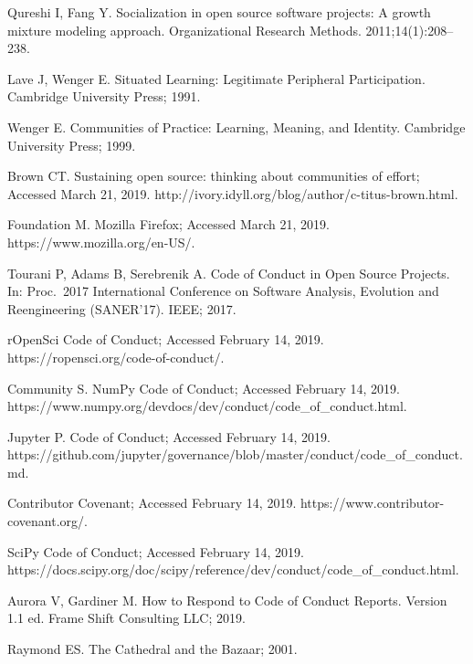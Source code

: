 \documentclass[10pt,letterpaper]{article}
\begin{document}
\begin{thebibliography}{10}

Qureshi I, Fang Y.
\newblock Socialization in open source software projects: A growth mixture
  modeling approach.
\newblock Organizational Research Methods. 2011;14(1):208--238.

Lave J, Wenger E.
\newblock Situated Learning: Legitimate Peripheral Participation.
\newblock Cambridge University Press; 1991.

Wenger E.
\newblock Communities of Practice: Learning, Meaning, and Identity.
\newblock Cambridge University Press; 1999.

Brown CT. Sustaining open source: thinking about communities of effort;
  Accessed March 21, 2019.
\newblock http://ivory.idyll.org/blog/author/c-titus-brown.html.

Foundation M. Mozilla Firefox; Accessed March 21, 2019.
\newblock https://www.mozilla.org/en-US/.

Tourani P, Adams B, Serebrenik A.
\newblock Code of Conduct in Open Source Projects.
\newblock In: Proc.\ 2017 International Conference on Software Analysis,
  Evolution and Reengineering ({SANER'17}). {IEEE}; 2017.

rOpenSci Code of Conduct; Accessed February 14, 2019.
\newblock https://ropensci.org/code-of-conduct/.

Community S. NumPy Code of Conduct; Accessed February 14, 2019.
\newblock https://www.numpy.org/devdocs/dev/conduct/code\_of\_conduct.html.

Jupyter P. Code of Conduct; Accessed February 14, 2019.
\newblock
  https://github.com/jupyter/governance/blob/master/conduct/code\_of\_conduct.md.

Contributor Covenant; Accessed February 14, 2019.
\newblock https://www.contributor-covenant.org/.

SciPy Code of Conduct; Accessed February 14, 2019.
\newblock
  https://docs.scipy.org/doc/scipy/reference/dev/conduct/code\_of\_conduct.html.

Aurora V, Gardiner M.
\newblock How to Respond to Code of Conduct Reports.
\newblock Version 1.1 ed. Frame Shift Consulting LLC; 2019.

Raymond ES. The Cathedral and the Bazaar; 2001.


\end{thebibliography}
\end{document}
